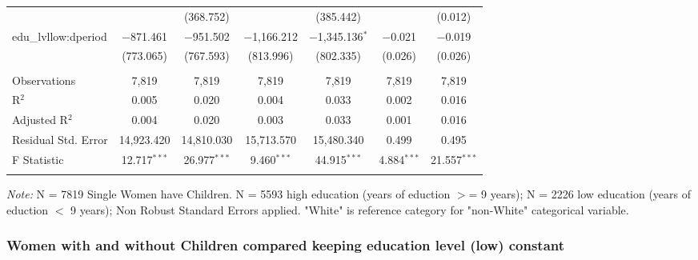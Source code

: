 \documentclass[a4paper]{article}
\begin{document}
\begin{table}[!htbp]
\begin{adjustwidth}{0.cm}{-0cm}
\begin{threeparttable}
\begin{tabular}{@{\extracolsep{-2pt}}lcccccc}
  &  & (368.752) &  & (385.442) &  & (0.012) \\ 
  edu\_lvllow:dperiod & $-$871.461 & $-$951.502 & $-$1,166.212 & $-$1,345.136$^{*}$ & $-$0.021 & $-$0.019 \\ 
  & (773.065) & (767.593) & (813.996) & (802.335) & (0.026) & (0.026) \\ 
 \hline \\[-1.8ex] 
Observations & 7,819 & 7,819 & 7,819 & 7,819 & 7,819 & 7,819 \\ 
R$^{2}$ & 0.005 & 0.020 & 0.004 & 0.033 & 0.002 & 0.016 \\ 
Adjusted R$^{2}$ & 0.004 & 0.020 & 0.003 & 0.033 & 0.001 & 0.016 \\ 
Residual Std. Error & 14,923.420 & 14,810.030  & 15,713.570 & 15,480.340 & 0.499 & 0.495 \\ 
F Statistic & 12.717$^{***}$ & 26.977$^{***}$  & 9.460$^{***}$  & 44.915$^{***}$  & 4.884$^{***}$ & 21.557$^{***}$  \\
\hline 
\hline \\[-3.5ex] 
\end{tabular} 
\begin{tablenotes}
      \small
      \item\textit{Note:} N = 7819 Single Women have Children. N = 5593 high education (years of eduction $>$= 9 years); N = 2226 low education (years of eduction $<$ 9 years); Non Robust Standard Errors applied. "White" is reference category for "non-White" categorical variable.
    \end{tablenotes}
\end{threeparttable}
\end{adjustwidth}
%
\end{table}

\subsubsection{Women with and without Children compared keeping education level (low) constant}
\end{document}
